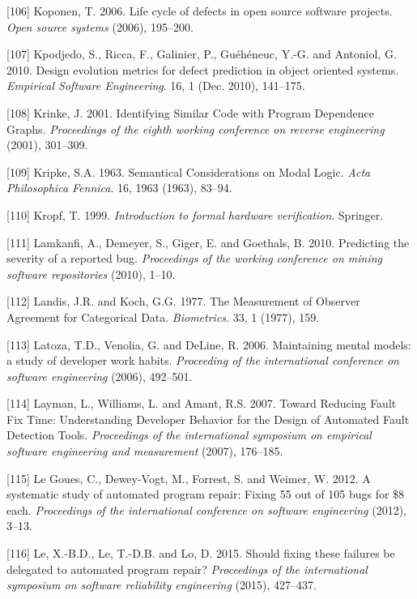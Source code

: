 \documentclass[12pt]{report}
\begin{document}
\hypertarget{ref-Koponen2006}{}
{[}106{]} Koponen, T. 2006. Life cycle of defects in open source
software projects. \emph{Open source systems} (2006), 195--200.

\hypertarget{ref-Kpodjedo2010}{}
{[}107{]} Kpodjedo, S., Ricca, F., Galinier, P., Guéhéneuc, Y.-G. and
Antoniol, G. 2010. Design evolution metrics for defect prediction in
object oriented systems. \emph{Empirical Software Engineering}. 16, 1
(Dec. 2010), 141--175.

\hypertarget{ref-Krinke2001}{}
{[}108{]} Krinke, J. 2001. Identifying Similar Code with Program
Dependence Graphs. \emph{Proceedings of the eighth working conference on
reverse engineering} (2001), 301--309.

\hypertarget{ref-Kripke1963}{}
{[}109{]} Kripke, S.A. 1963. Semantical Considerations on Modal Logic.
\emph{Acta Philosophica Fennica}. 16, 1963 (1963), 83--94.

\hypertarget{ref-kropf1999introduction}{}
{[}110{]} Kropf, T. 1999. \emph{Introduction to formal hardware
verification}. Springer.

\hypertarget{ref-Lamkanfi2010}{}
{[}111{]} Lamkanfi, A., Demeyer, S., Giger, E. and Goethals, B. 2010.
Predicting the severity of a reported bug. \emph{Proceedings of the
working conference on mining software repositories} (2010), 1--10.

\hypertarget{ref-Landis1977}{}
{[}112{]} Landis, J.R. and Koch, G.G. 1977. The Measurement of Observer
Agreement for Categorical Data. \emph{Biometrics}. 33, 1 (1977), 159.

\hypertarget{ref-LaToza2006}{}
{[}113{]} Latoza, T.D., Venolia, G. and DeLine, R. 2006. Maintaining
mental models: a study of developer work habits. \emph{Proceeding of the
international conference on software engineering} (2006), 492--501.

\hypertarget{ref-Layman2007}{}
{[}114{]} Layman, L., Williams, L. and Amant, R.S. 2007. Toward Reducing
Fault Fix Time: Understanding Developer Behavior for the Design of
Automated Fault Detection Tools. \emph{Proceedings of the international
symposium on empirical software engineering and measurement} (2007),
176--185.

\hypertarget{ref-le2012systematic}{}
{[}115{]} Le Goues, C., Dewey-Vogt, M., Forrest, S. and Weimer, W. 2012.
A systematic study of automated program repair: Fixing 55 out of 105
bugs for \$8 each. \emph{Proceedings of the international conference on
software engineering} (2012), 3--13.

\hypertarget{ref-le2015should}{}
{[}116{]} Le, X.-B.D., Le, T.-D.B. and Lo, D. 2015. Should fixing these
failures be delegated to automated program repair? \emph{Proceedings of
the international symposium on software reliability engineering} (2015),
427--437.
\end{document}
